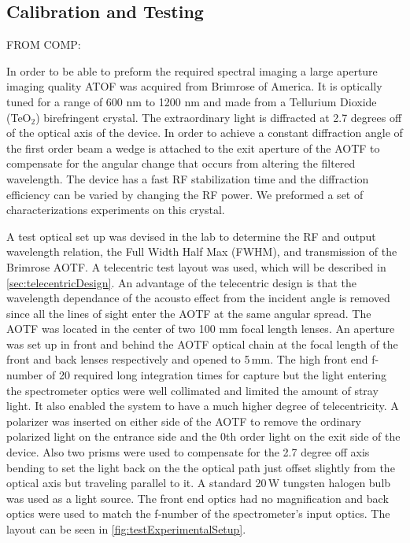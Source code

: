 \subsection{Calibration and Testing}

FROM COMP:

In order to be able to preform the required spectral imaging a large aperture imaging quality ATOF was acquired from Brimrose of America. It is optically tuned for a range of 600 nm to 1200 nm and made from a Tellurium Dioxide (TeO$_{2}$) birefringent crystal. The extraordinary light is diffracted at 2.7 degrees off of the optical axis of the device. In order to achieve a constant diffraction angle of the first order beam a wedge is attached to the exit aperture of the AOTF to compensate for the angular change that occurs from altering the filtered wavelength.  The device has a fast RF stabilization time and the diffraction efficiency can be varied by changing the RF power. We preformed a set of characterizations experiments on this crystal.

A test optical set up was devised in the lab to determine the RF and output wavelength relation, the Full Width Half Max (FWHM), and transmission of the Brimrose AOTF. A telecentric test layout was used, which will be described in \autoref{sec:telecentricDesign}. An advantage of the telecentric design is that the wavelength dependance of the acousto effect from the incident angle is removed since all the lines of sight enter the AOTF at the same angular spread. The AOTF was located in the center of two 100 mm focal length lenses. An aperture was set up in front and behind the AOTF optical chain at the focal length of the front and back lenses respectively and opened to 5\,mm. The high front end f-number of 20 required long integration times for capture but the light entering the spectrometer optics were well collimated and limited the amount of stray light. It also enabled the system to have a much higher degree of telecentricity. A polarizer was inserted on either side of the AOTF to remove the ordinary polarized light on the entrance side and the 0th order light on the exit side of the device. Also two prisms were used to compensate for the 2.7 degree off axis bending to set the light back on the the optical path just offset slightly from the optical axis but traveling parallel to it. A standard 20\,W tungsten halogen bulb was used as a light source. The front end optics had no magnification and back optics were used to match the f-number of the spectrometer's input optics. The layout can be seen in \autoref{fig:testExperimentalSetup}.

